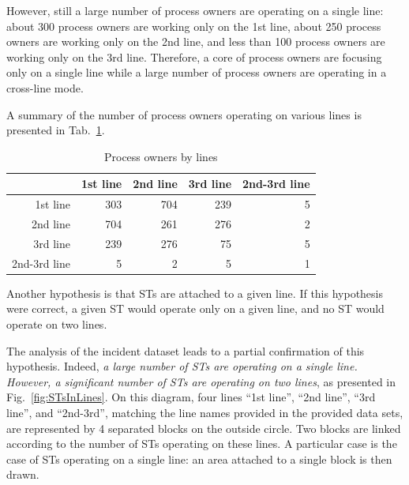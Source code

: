 \documentclass[lnbip]{svmultln}
\begin{document}
However, still a large number of process owners are operating on a single line: about 300 process owners are working only on the 1st line, about 250 process owners are working only on the 2nd line, and less than 100 process owners are working only on the 3rd line. Therefore, a core of process owners are focusing only on a single line while a large number of process owners are operating in a cross-line mode.

A summary of the number of process owners operating on various lines is presented in Tab.~\ref{tab:personsByLines}.

\begin{table}
\caption{Process owners by lines}
\label{tab:personsByLines}
\begin{center}
\begin{tabular}{rrrrr}
& 1st line & 2nd line & 3rd line & 2nd-3rd line \\[2pt]
\hline\rule{0pt}{12pt}
1st line	   & 303 & 704 & 239 & 5\\
2nd line     & 704 & 261 & 276 & 2\\
3rd line     & 239 & 276 &  75 & 5\\
2nd-3rd line &   5 &   2 &   5 & 1\\[2pt]
\hline
\end{tabular}
\end{center}
\end{table}




Another hypothesis is that STs are attached to a given line. If this hypothesis were correct, a given ST would operate only on a given line, and no ST would operate on two lines.

The analysis of the incident dataset leads to a partial confirmation of this hypothesis. Indeed, \emph{a large number of STs are operating on a single line. However, a significant number of STs are operating on two lines}, as presented in Fig.~\ref{fig:STsInLines}. On this diagram, four lines ``1st line'', ``2nd line'', ``3rd line'', and ``2nd-3rd'', matching the line names provided in the provided data sets, are represented by 4 separated blocks on the outside circle. Two blocks are linked according to the number of STs operating on these lines. A particular case is the case of STs operating on a single line: an area attached to a single block is then drawn.
\end{document}
